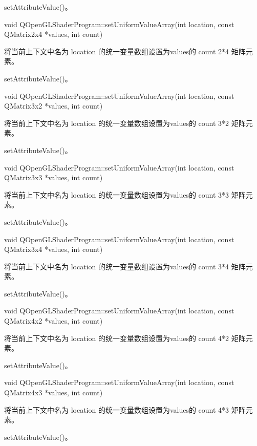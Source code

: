 \begin{seeAlso}
setAttributeValue()。
\end{seeAlso}

void QOpenGLShaderProgram::setUniformValueArray(int location, const QMatrix2x4 *values, int count)

将当前上下文中名为 location 的统一变量数组设置为values的 count 2*4 矩阵元素。

\begin{seeAlso}
setAttributeValue()。
\end{seeAlso}

void QOpenGLShaderProgram::setUniformValueArray(int location, const QMatrix3x2 *values, int count)

将当前上下文中名为 location 的统一变量数组设置为values的 count 3*2 矩阵元素。

\begin{seeAlso}
setAttributeValue()。
\end{seeAlso}

void QOpenGLShaderProgram::setUniformValueArray(int location, const QMatrix3x3 *values, int count)

将当前上下文中名为 location 的统一变量数组设置为values的 count 3*3 矩阵元素。

\begin{seeAlso}
setAttributeValue()。
\end{seeAlso}

void QOpenGLShaderProgram::setUniformValueArray(int location, const QMatrix3x4 *values, int count)

将当前上下文中名为 location 的统一变量数组设置为values的 count 3*4 矩阵元素。

\begin{seeAlso}
setAttributeValue()。
\end{seeAlso}

void QOpenGLShaderProgram::setUniformValueArray(int location, const QMatrix4x2 *values, int count)

将当前上下文中名为 location 的统一变量数组设置为values的 count 4*2 矩阵元素。


\begin{seeAlso}
setAttributeValue()。
\end{seeAlso}

void QOpenGLShaderProgram::setUniformValueArray(int location, const QMatrix4x3 *values, int count)

将当前上下文中名为 location 的统一变量数组设置为values的 count 4*3 矩阵元素。

\begin{seeAlso}
setAttributeValue()。
\end{seeAlso}


